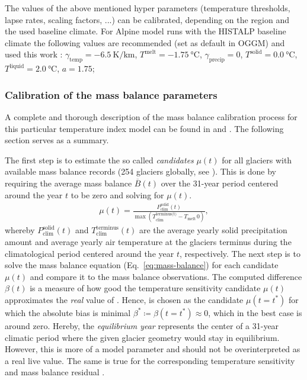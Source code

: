         The values of the above mentioned hyper parameters (temperature thresholds, lapse rates, scaling factors, ...) can be calibrated, depending on the region and the used baseline climate. For Alpine model runs with the HISTALP baseline climate the following values are recommended (set as default in OGGM) and used this work \citep{Dusch2018}: $\gamma_\text{temp} = \SI{-6.5}{\kelvin\per\kilo\meter}$, $T^\text{melt} = \SI{-1.75}{\celsius}$, $\gamma_\text{precip} = 0$, $T^\text{solid} = \SI{0.0}{\celsius}$, $T^\text{liquid} = \SI{2.0}{\celsius}$, $a = 1.75$;

        \subsubsection{Calibration of the mass balance parameters} %
        \label{ssub:mb_calib}

            A complete and thorough description of the mass balance calibration process for this particular temperature index model can be found in \citet[Section 2.1.9, 2.1.10]{Marzeion2012b} and \citet[][Section 3.3]{Maussion2019}. The following section serves as a summary.
            
            The first step is to estimate the so called \emph{candidates} $\mu(t)$ for all glaciers with available mass balance records (254 glaciers globally, see \citet{WGMS2017}). This is done by requiring the average mass balance $\overline B(t)$ over the 31-year period centered around the year $t$ to be zero and solving for $\mu(t)$.
            \begin{align}\label{eq:mu-candidates}
                \mu(t) = \frac{P_\text{clim}^\text{solid}(t)}{\max(T_\text{clim}^\text{terminus(t)} - T_\text{melt}\, 0)},
            \end{align}
            whereby $P_{\text{clim}}^{\text{solid}}(t)$ and $T_{\text{clim}}^{\text{terminus}}(t)$ are the average yearly solid precipitation amount and average yearly air temperature at the glaciers terminus during the climatological period centered around the year $t$, respectively. The next step is to solve the mass balance equation (Eq.~\ref{eq:mass-balance}) for each candidate $\mu(t)$ and compare it to the mass balance observations. The computed difference $\beta(t)$ is a measure of how good the temperature sensitivity candidate $\mu(t)$ approximates the \textit{real} value of \mustar{}. Hence, \mustar{} is chosen as the candidate $\mu(t = t^*)$ for which the absolute bias is minimal $\beta^* \coloneqq \beta(t = t^*) \approx 0$, which in the best case is around zero. Hereby, the \textit{equilibrium year} \tstar{} represents the center of a 31-year climatic period where the given glacier geometry would stay in equilibrium. However, this is more of a model parameter and should not be overinterpreted as a real live value. The same is true for the corresponding temperature sensitivity \mustar{} and mass balance residual \bias{}.

